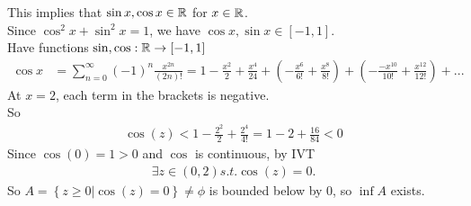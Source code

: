 \documentclass[a4paper]{article}
\begin{document}
This implies that $\sin x, \cos x \in \mathbb{R}$ for $x\in\mathbb{R}$.\\
Since $\cos^2 x + \sin^2 x = 1$, we have $\cos x, \sin x \in [-1,1]$.\\
Have functions $\sin,\cos: \mathbb{R} \to [-1,1]$\\
\begin{equation*}
\begin{aligned}
\cos x &= \sum_{n=0}^\infty \left(-1\right)^n \frac{x^{2n}}{\left(2n\right)!} = 1-\frac{x^2}{2} + \frac{x^4}{24}+\left(-\frac{x^6}{6!}+\frac{x^8}{8!}\right) + \left(-\frac{-x^10}{10!} + \frac{x^12}{12!}\right)+...
\end{aligned}
\end{equation*}
At $x=2$, each term in the brackets is negative.\\
So 
\begin{equation*}
\begin{aligned}
\cos\left(z\right) < 1-\frac{2^2}{2}+\frac{2^4}{4!} = 1-2+\frac{16}{84}<0
\end{aligned}
\end{equation*}
Since $\cos \left(0\right)=1>0$ and $\cos$ is continuous, by IVT
\begin{equation*}
\begin{aligned}
\exists z\in\left(0,2\right) s.t. \cos\left(z\right)=0.
\end{aligned}
\end{equation*}
So $A=\left\{z\geq 0|\cos\left(z\right)=0\right\} \neq \phi$ is bounded below by 0, so $\inf A$ exists.\\
\end{document}
